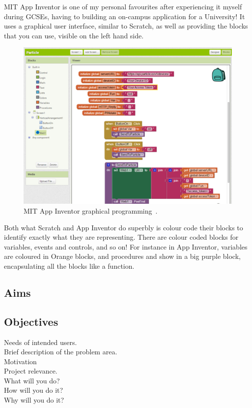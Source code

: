\documentclass[a4paper, 12pt]{article}
\begin{document}
    \clearpage
    MIT App Inventor is one of my personal favourites after experiencing it myself during GCSEs, 
    having to building an on-campus application for a University! It uses a graphical user 
    interface, similar to Scratch, as well as providing the blocks that you can use, visible on 
    the left hand side.

    \begin{figure}[h]
        \centering
        \includegraphics[width=150mm]{app_inventor}
        \caption{MIT App Inventor graphical programming~\cite{adafruit}.}
    \end{figure}

    Both what Scratch and App Inventor do superbly is colour code their blocks to identify 
    exactly what they are representing. There are colour coded blocks for variables, events 
    and controls, and so on! For instance in App Inventor, variables are coloured in Orange 
    blocks, and procedures and show in a big purple block, encapsulating all the blocks like 
    a function.

        \subsection{Aims}


        \subsection{Objectives}
    
        Needs of intended users. \\
        Brief description of the problem area. \\
        Motivation \\
        Project relevance. \\
        What will you do? \\ 
        How will you do it? \\ 
        Why will you do it? \\
\end{document}
